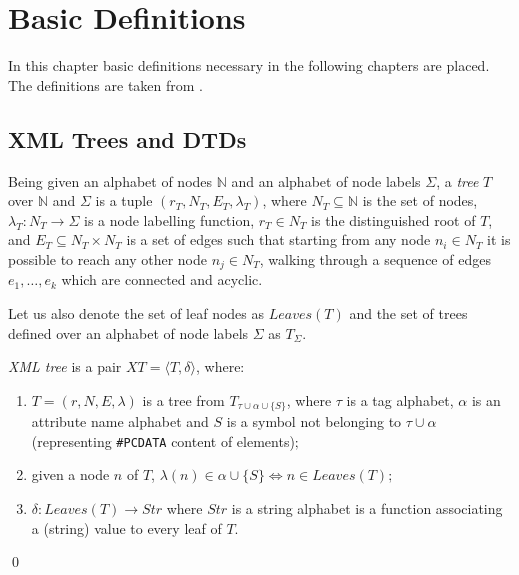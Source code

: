 \chapter{Basic Definitions}

In this chapter basic definitions necessary in the following chapters are placed. The definitions are taken from \cite{RepAndConsistentAnswer, QueryXML, ImprovingXML}.


\section{XML Trees and DTDs}
\begin{define}[Tree]
Being given an alphabet of nodes $\mathbb{N}$ and an alphabet of node labels $\Sigma$, a {\sl tree} $T$ over $\mathbb{N}$ and $\Sigma$ is a tuple $(r_T, N_T, E_T, \lambda_T)$, where $N_T \subseteq \mathbb{N}$ is the set of nodes, $\lambda_T : N_T \to \Sigma$ is a node labelling function, $r_T \in N_T$ is the distinguished root of $T$, and $E_T \subseteq N_T \times N_T$ is a set of edges such that starting from any node $n_i \in N_T$ it is possible to reach any other node $n_j \in N_T$, walking through a sequence of edges $e_1,\dots,e_k$ which are connected and acyclic.
\end{define}

\noindent Let us also denote the set of leaf nodes as $Leaves(T)$ and the set of trees defined over an alphabet of node labels $\Sigma$ as $T_\Sigma$.

\begin{define}\label{xmlTree}
{\sl XML tree} is a pair $XT=\langle T,\delta \rangle$, where:
\renewcommand{\labelenumi}{\roman{enumi})}
	\begin{enumerate}
		\item $T = (r, N, E, \lambda)$ is a tree from $T_{\tau\cup\alpha\cup\{S\}}$, where $\tau$ is a tag alphabet, $\alpha$ is an attribute name alphabet and $S$ is a symbol not belonging to $\tau\cup\alpha$ (representing \texttt{\#PCDATA} content of elements)$;$
		\item given a node $n$ of $T$, $\lambda(n) \in \alpha \cup \{S\} \Leftrightarrow n \in Leaves(T);$
		\item $\delta : Leaves(T) \rightarrow Str$ where $Str$ is a string alphabet is a function associating a (string) value to every leaf of $T$.
	\end{enumerate}\qed
\end{define}

